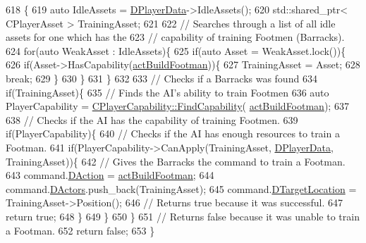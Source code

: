 \begin{DoxyCode}
618                                                           \{
619     \textcolor{keyword}{auto} IdleAssets = \hyperlink{classCAIPlayer_a83b5113c8f7e80df54940b647c5ee2e6}{DPlayerData}->IdleAssets();
620     std::shared\_ptr< CPlayerAsset > TrainingAsset;
621     
622     \textcolor{comment}{// Searches through a list of all idle assets for one which has the }
623     \textcolor{comment}{// capability of training Footmen (Barracks).}
624     \textcolor{keywordflow}{for}(\textcolor{keyword}{auto} WeakAsset : IdleAssets)\{
625         \textcolor{keywordflow}{if}(\textcolor{keyword}{auto} Asset = WeakAsset.lock())\{
626             \textcolor{keywordflow}{if}(Asset->HasCapability(\hyperlink{GameDataTypes_8h_a35b98ce26aca678b03c6f9f76e4778cea48885d6af1b7c05c5887978f88556662}{actBuildFootman}))\{
627                 TrainingAsset = Asset;
628                 \textcolor{keywordflow}{break};
629             \}
630         \}
631     \}
632 
633     \textcolor{comment}{// Checks if a Barracks was found}
634     \textcolor{keywordflow}{if}(TrainingAsset)\{
635         \textcolor{comment}{// Finds the AI's ability to train Footmen}
636         \textcolor{keyword}{auto} PlayerCapability = \hyperlink{classCPlayerCapability_a881ba4b87385d7cfe5cb6ced2d26f226}{CPlayerCapability::FindCapability}(
      \hyperlink{GameDataTypes_8h_a35b98ce26aca678b03c6f9f76e4778cea48885d6af1b7c05c5887978f88556662}{actBuildFootman}); 
637         
638         \textcolor{comment}{// Checks if the AI has the capability of training Footmen.}
639         \textcolor{keywordflow}{if}(PlayerCapability)\{
640             \textcolor{comment}{// Checks if the AI has enough resources to train a Footman.}
641             \textcolor{keywordflow}{if}(PlayerCapability->CanApply(TrainingAsset, \hyperlink{classCAIPlayer_a83b5113c8f7e80df54940b647c5ee2e6}{DPlayerData}, TrainingAsset))\{
642                 \textcolor{comment}{// Gives the Barracks the command to train a Footman.}
643                 command.\hyperlink{structSPlayerCommandRequest_a80897bbccf2c4e0b148a7aa815a926c6}{DAction} = \hyperlink{GameDataTypes_8h_a35b98ce26aca678b03c6f9f76e4778cea48885d6af1b7c05c5887978f88556662}{actBuildFootman};
644                 command.\hyperlink{structSPlayerCommandRequest_aa37fc01519676345703d78b9f573894a}{DActors}.push\_back(TrainingAsset);       
645                 command.\hyperlink{structSPlayerCommandRequest_a701702b94ca2fd2738e95ef6711dd41a}{DTargetLocation} = TrainingAsset->Position();
646                 \textcolor{comment}{// Returns true because it was successful.}
647                 \textcolor{keywordflow}{return} \textcolor{keyword}{true};
648             \}
649         \}
650     \}
651     \textcolor{comment}{// Returns false because it was unable to train a Footman.}
652     \textcolor{keywordflow}{return} \textcolor{keyword}{false};
653 \}
\end{DoxyCode}
